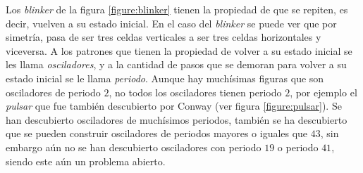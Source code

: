 Los \textit{blinker} de la figura \ref{figure:blinker} tienen la propiedad de que se repiten, es decir, vuelven a su estado inicial. En el caso del \textit{blinker} se puede ver que por simetr\'ia, pasa de ser tres celdas verticales a ser tres celdas horizontales y viceversa. A los patrones que tienen la propiedad de volver a su estado inicial se les llama \textit{osciladores}, y a la cantidad de pasos que se demoran para volver a su estado inicial se le llama \textit{periodo}. Aunque hay much\'isimas figuras que son osciladores de periodo $2$, no todos los osciladores tienen periodo $2$, por ejemplo el \textit{pulsar} que fue tambi\'en descubierto por Conway (ver figura \ref{figure:pulsar}). Se han descubierto osciladores de much\'isimos periodos, tambi\'en se ha descubierto que se pueden construir osciladores de periodos mayores o iguales que $43$, sin embargo a\'un no se han descubierto osciladores con periodo $19$ o periodo $41$, siendo este a\'un un problema abierto.

